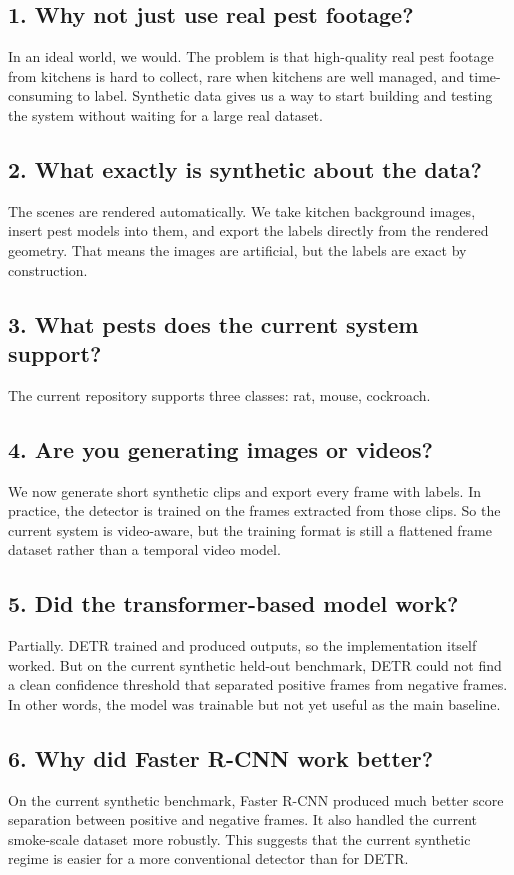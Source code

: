 \documentclass[11pt]{article}
\begin{document}
\subsection*{1. Why not just use real pest footage?}
In an ideal world, we would. The problem is that high-quality real pest footage from kitchens is hard to collect, rare when kitchens are well managed, and time-consuming to label. Synthetic data gives us a way to start building and testing the system without waiting for a large real dataset.

\subsection*{2. What exactly is synthetic about the data?}
The scenes are rendered automatically. We take kitchen background images, insert pest models into them, and export the labels directly from the rendered geometry. That means the images are artificial, but the labels are exact by construction.

\subsection*{3. What pests does the current system support?}
The current repository supports three classes: rat, mouse, cockroach.

\subsection*{4. Are you generating images or videos?}
We now generate short synthetic clips and export every frame with labels. In practice, the detector is trained on the frames extracted from those clips. So the current system is video-aware, but the training format is still a flattened frame dataset rather than a temporal video model.

\subsection*{5. Did the transformer-based model work?}
Partially. DETR trained and produced outputs, so the implementation itself worked. But on the current synthetic held-out benchmark, DETR could not find a clean confidence threshold that separated positive frames from negative frames. In other words, the model was trainable but not yet useful as the main baseline.

\subsection*{6. Why did Faster R-CNN work better?}
On the current synthetic benchmark, Faster R-CNN produced much better score separation between positive and negative frames. It also handled the current smoke-scale dataset more robustly. This suggests that the current synthetic regime is easier for a more conventional detector than for DETR.
\end{document}
